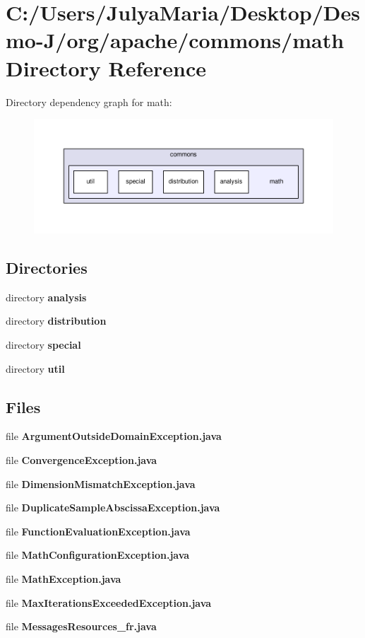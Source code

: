 \section{C\-:/\-Users/\-Julya\-Maria/\-Desktop/\-Desmo-\/\-J/org/apache/commons/math Directory Reference}
\label{dir_26660134b2d1f0a0ab502588c8abda9a}
Directory dependency graph for math\-:
\nopagebreak
\begin{figure}[H]
\begin{center}
\leavevmode
\includegraphics[width=350pt]{dir_26660134b2d1f0a0ab502588c8abda9a_dep}
\end{center}
\end{figure}
\subsection*{Directories}
\begin{DoxyCompactItemize}
\item 
directory {\bf analysis}
\item 
directory {\bf distribution}
\item 
directory {\bf special}
\item 
directory {\bf util}
\end{DoxyCompactItemize}
\subsection*{Files}
\begin{DoxyCompactItemize}
\item 
file {\bfseries Argument\-Outside\-Domain\-Exception.\-java}
\item 
file {\bfseries Convergence\-Exception.\-java}
\item 
file {\bfseries Dimension\-Mismatch\-Exception.\-java}
\item 
file {\bfseries Duplicate\-Sample\-Abscissa\-Exception.\-java}
\item 
file {\bfseries Function\-Evaluation\-Exception.\-java}
\item 
file {\bfseries Math\-Configuration\-Exception.\-java}
\item 
file {\bfseries Math\-Exception.\-java}
\item 
file {\bfseries Max\-Iterations\-Exceeded\-Exception.\-java}
\item 
file {\bfseries Messages\-Resources\-\_\-fr.\-java}
\end{DoxyCompactItemize}
